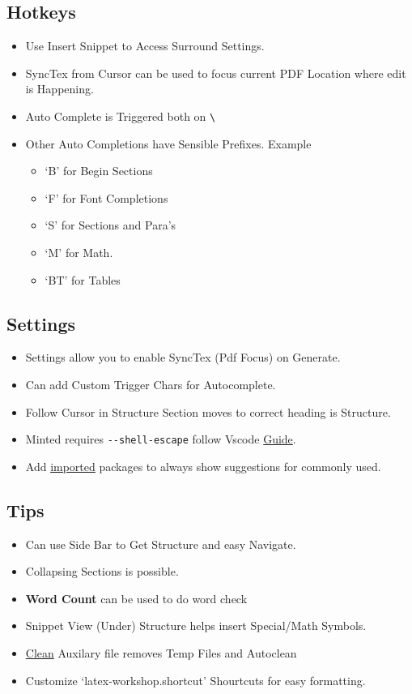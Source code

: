 \documentclass{report}[a4paper,12pt] %
\begin{document}
\subsection{Hotkeys}
\begin{itemize}
  \item Use Insert Snippet to Access Surround Settings.
  \item SyncTex from Cursor can be used to focus current PDF Location where edit is Happening.
  \item Auto Complete is Triggered both on \verb|\|
  \item Other Auto Completions have Sensible Prefixes. Example
  \begin{itemize}
    \item `B' for Begin Sections
    \item `F' for Font Completions
    \item `S' for Sections and Para's
    \item `M' for Math.
    \item `BT' for Tables
  \end{itemize}
\end{itemize}

\subsection{Settings}
\begin{itemize}
  \item Settings allow you to enable SyncTex (Pdf Focus) on Generate.
  \item Can add Custom Trigger Chars for Autocomplete.
  \item Follow Cursor in Structure Section moves to correct heading is Structure.
  \item Minted requires \verb|--shell-escape| follow Vscode \href{https://leportella.com/minted-vscode/}{Guide}.
  \item Add \href{https://www.reddit.com/r/LaTeX/comments/pwkopy/subfile_autocompletion_in_vs_code/}{imported} packages to always show suggestions for commonly used.
\end{itemize}

\subsection{Tips}
\begin{itemize}
  \item Can use Side Bar to Get Structure and easy Navigate.
  \item Collapsing Sections is possible.
  \item \textbf{Word Count} can be used to do word check
  \item Snippet View (Under) Structure helps insert Special/Math Symbols.
  \item \href{https://github.com/James-Yu/LaTeX-Workshop/wiki/Compile#cleaning-generated-files}{Clean} Auxilary file removes Temp Files and Autoclean
  \item Customize `latex-workshop.shortcut' Shourtcuts for easy formatting.
\end{itemize}
\end{document}
